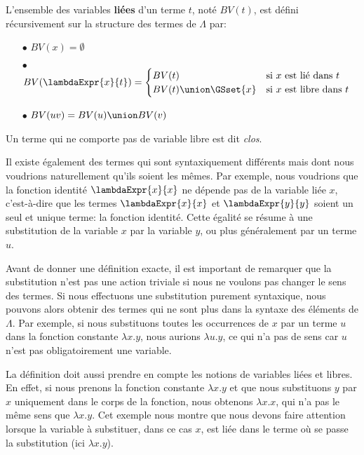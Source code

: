 \begin{definition} 
  L'ensemble des variables \textbf{liées} d'un terme $t$, noté $BV(t)$, est défini
  récursivement sur la structure des termes de $\Lambda$ par:
  \begin{itemize}
  \item[$\bullet$] $BV(x) = \emptyset$
  \item[$\bullet$] $BV(\lambdaExpr{x}{t}) = \begin{cases}
      BV(t)                  & \text{si}\ x\ \text{est lié dans}\ t \\
      BV(t) \union \GSset{x} & \text{si}\ x\ \text{est libre dans}\ t
    \end{cases}$
  \item[$\bullet$] $BV(u v) = BV(u) \union BV(v)$
  \end{itemize}
\end{definition}

Un terme qui ne comporte pas de variable libre est dit \textit{clos}.

Il existe également des termes qui sont syntaxiquement différents mais dont nous
voudrions naturellement qu'ils soient les mêmes. Par exemple, nous voudrions que
la fonction identité $\lambdaExpr{x}{x}$ ne dépende pas de la variable liée $x$,
c'est-à-dire que les termes $\lambdaExpr{x}{x}$ et $\lambdaExpr{y}{y}$ soient un seul et
unique terme: la fonction identité. Cette égalité se résume à une substitution
de la variable $x$ par la variable $y$, ou plus généralement par un terme $u$.

Avant de donner une définition exacte, il est important de remarquer que la
substitution n'est pas une action triviale si nous ne voulons pas changer le
sens des termes. Si nous effectuons une
substitution purement syntaxique, nous pouvons alors obtenir des termes qui ne sont
plus dans la syntaxe des éléments de $\Lambda$. Par exemple, si nous
substituons toutes les occurrences de $x$ par un terme $u$ dans la fonction constante
$\lambda x . y$, nous aurions $\lambda u . y$, ce qui n'a pas de sens car $u$ n'est
pas obligatoirement une variable.

La définition doit aussi prendre en compte les notions de variables liées et libres. En effet, si nous
prenons la fonction constante $\lambda x . y$ et que nous substituons $y$ par 
$x$ uniquement dans le corps de la fonction, nous obtenons $\lambda x . x$, qui
n'a pas le même sens que $\lambda x . y$. Cet exemple nous montre que nous
devons faire attention lorsque la variable à substituer, dans ce cas $x$, est
liée dans le terme où se passe la substitution (ici $\lambda x . y$).


